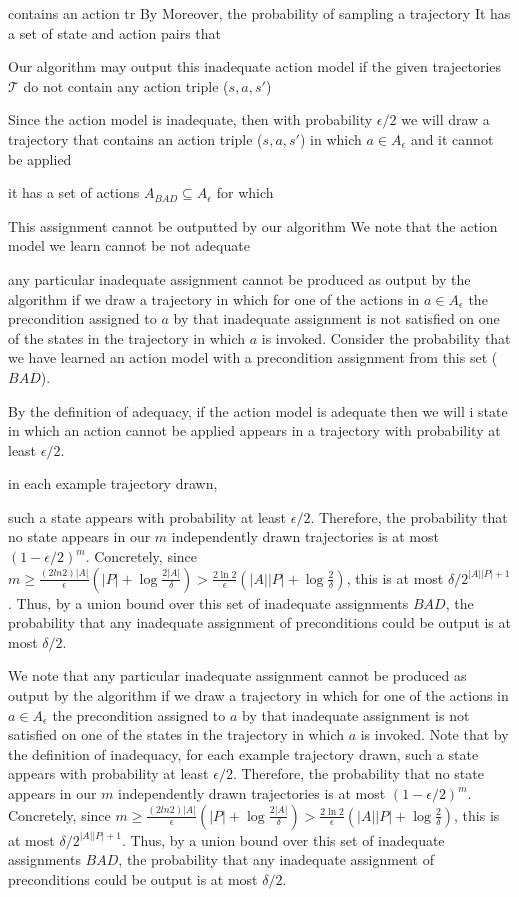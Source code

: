 contains an action tr
By Moreover, the probability of sampling a trajectory 
It has a set of state and action pairs that 

Our algorithm may output this inadequate action model if 
the given trajectories $\mathcal{T}$ do not contain any action triple ($s,a,s'$) 


Since the action model is inadequate, then with probability $\epsilon/2$ 
we will draw a trajectory that contains an action triple ($s,a,s'$) 
in which $a\in A_\epsilon$ and it cannot be applied 


it has a set of actions $A_{BAD}\subseteq A_\epsilon$ for which 

This assignment cannot be outputted by our algorithm 
We note that the action model we learn cannot be not adequate 

any particular inadequate assignment cannot be produced as output by the algorithm if we draw a trajectory in which for one of the actions in $a\in A_\epsilon$ the precondition assigned to $a$ by that inadequate assignment is not satisfied on one of the states in the trajectory in which $a$ is invoked. 
Consider the probability that we have learned an action model with a precondition assignment from this set ($BAD$). 

By the definition of adequacy, if the action model is adequate then 
we will 
i state in which an action cannot be applied appears in a trajectory with probability at least $\epsilon/2$. 

in each example trajectory drawn, 


such a state appears with probability at least $\epsilon/2$. Therefore, the probability that no state appears in our $m$ independently drawn trajectories is at most $(1-\epsilon/2)^m$. Concretely, since $m\geq\frac{(2ln 2)|A|}{\epsilon}(|P|+\log\frac{2|A|}{\delta})>\frac{2\ln 2}{\epsilon}(|A||P|+\log\frac{2}{\delta})$, this is at most $\delta/2^{|A||P|+1}$. Thus, by a union bound over this set of inadequate assignments $BAD$, the probability that any inadequate assignment of preconditions could be output is at most $\delta/2$.



We note that any particular inadequate assignment cannot be produced as output by the algorithm if we draw a trajectory in which for one of the actions in $a\in A_\epsilon$ the precondition assigned to $a$ by that inadequate assignment is not satisfied on one of the states in the trajectory in which $a$ is invoked. Note that by the definition of inadequacy, for each example trajectory drawn, such a state appears with probability at least $\epsilon/2$. Therefore, the probability that no state appears in our $m$ independently drawn trajectories is at most $(1-\epsilon/2)^m$. Concretely, since $m\geq\frac{(2ln 2)|A|}{\epsilon}(|P|+\log\frac{2|A|}{\delta})>\frac{2\ln 2}{\epsilon}(|A||P|+\log\frac{2}{\delta})$, this is at most $\delta/2^{|A||P|+1}$. Thus, by a union bound over this set of inadequate assignments $BAD$, the probability that any inadequate assignment of preconditions could be output is at most $\delta/2$.








